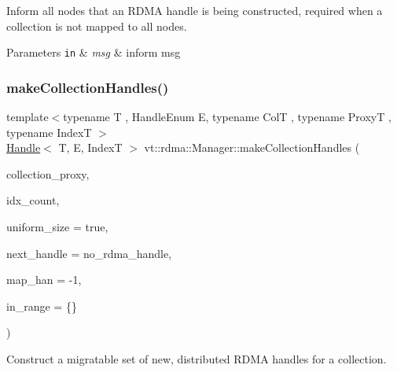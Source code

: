 Inform all nodes that an R\+D\+MA handle is being constructed, required when a collection is not mapped to all nodes. 


\begin{DoxyParams}[1]{Parameters}
\mbox{\tt in}  & {\em msg} & inform msg \\
\hline
\end{DoxyParams}
\mbox{\label{structvt_1_1rdma_1_1_manager_aad62be5c2cb0225139cf3d665b5fd7f2}} 
\subsubsection{\texorpdfstring{make\+Collection\+Handles()}{makeCollectionHandles()}}
{\footnotesize\ttfamily template$<$typename T , Handle\+Enum E, typename ColT , typename ProxyT , typename IndexT $>$ \\
\hyperlink{structvt_1_1rdma_1_1_handle}{Handle}$<$ T, E, IndexT $>$ vt\+::rdma\+::\+Manager\+::make\+Collection\+Handles (\begin{DoxyParamCaption}\item[{ProxyT}]{collection\+\_\+proxy,  }\item[{std\+::size\+\_\+t}]{idx\+\_\+count,  }\item[{bool}]{uniform\+\_\+size = {\ttfamily true},  }\item[{\hyperlink{namespacevt_a10442579ec4e7ebef223818e64bcf908}{R\+D\+M\+A\+\_\+\+Handle\+Type}}]{next\+\_\+handle = {\ttfamily no\+\_\+rdma\+\_\+handle},  }\item[{\hyperlink{namespacevt_af64846b57dfcaf104da3ef6967917573}{vt\+::\+Handler\+Type}}]{map\+\_\+han = {\ttfamily -\/1},  }\item[{IndexT}]{in\+\_\+range = {\ttfamily \{\}} }\end{DoxyParamCaption})}



Construct a migratable set of new, distributed R\+D\+MA handles for a collection. 


